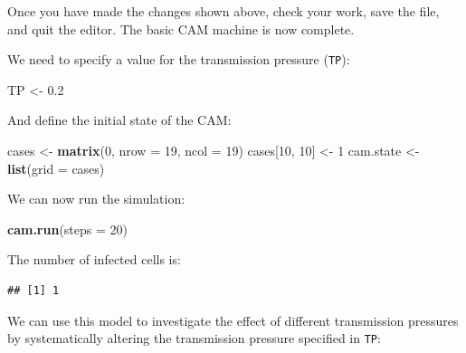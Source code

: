 \documentclass[12pt,a4paper]{book}
\newenvironment{Shaded}{\begin{snugshade}}{\end{snugshade}}
\newcommand{\DataTypeTok}[1]{\textcolor[rgb]{0.13,0.29,0.53}{#1}}
\newcommand{\DecValTok}[1]{\textcolor[rgb]{0.00,0.00,0.81}{#1}}
\newcommand{\FloatTok}[1]{\textcolor[rgb]{0.00,0.00,0.81}{#1}}
\newcommand{\KeywordTok}[1]{\textcolor[rgb]{0.13,0.29,0.53}{\textbf{#1}}}
\newcommand{\NormalTok}[1]{#1}
\newcommand{\OperatorTok}[1]{\textcolor[rgb]{0.81,0.36,0.00}{\textbf{#1}}}
\newcommand{\StringTok}[1]{\textcolor[rgb]{0.31,0.60,0.02}{#1}}
\theoremstyle{definition}
\theoremstyle{definition}
\theoremstyle{definition}
\theoremstyle{remark}
\begin{document}
Once you have made the changes shown above, check your work, save the
file, and quit the editor. The basic CAM machine is now complete.

We need to specify a value for the transmission pressure (\texttt{TP}):

\begin{Shaded}
\begin{Highlighting}[]
\NormalTok{TP <-}\StringTok{ }\FloatTok{0.2}
\end{Highlighting}
\end{Shaded}

And define the initial state of the CAM:

\begin{Shaded}
\begin{Highlighting}[]
\NormalTok{cases <-}\StringTok{ }\KeywordTok{matrix}\NormalTok{(}\DecValTok{0}\NormalTok{, }\DataTypeTok{nrow =} \DecValTok{19}\NormalTok{, }\DataTypeTok{ncol =} \DecValTok{19}\NormalTok{)}
\NormalTok{cases[}\DecValTok{10}\NormalTok{, }\DecValTok{10}\NormalTok{] <-}\StringTok{ }\DecValTok{1}
\NormalTok{cam.state <-}\StringTok{ }\KeywordTok{list}\NormalTok{(}\DataTypeTok{grid =}\NormalTok{ cases)}
\end{Highlighting}
\end{Shaded}

We can now run the simulation:

\begin{Shaded}
\begin{Highlighting}[]
\KeywordTok{cam.run}\NormalTok{(}\DataTypeTok{steps =} \DecValTok{20}\NormalTok{)}
\end{Highlighting}
\end{Shaded}

The number of infected cells is:

\begin{Shaded}
\end{Shaded}

\begin{verbatim}
## [1] 1
\end{verbatim}

We can use this model to investigate the effect of different
transmission pressures by systematically altering the transmission
pressure specified in \texttt{TP}:
\end{document}
